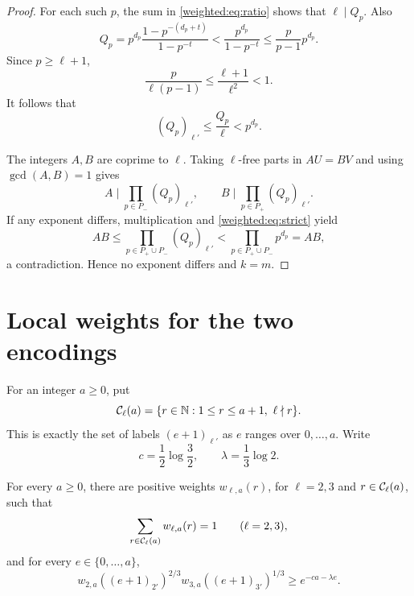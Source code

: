 \begin{proof}
For each such $p$, the sum in \eqref{weighted:eq:ratio} shows that $\ell\mid Q_p$. Also
\[
Q_p=p^{d_p}\frac{1-p^{-(d_p+t)}}{1-p^{-t}}
<\frac{p^{d_p}}{1-p^{-t}}
\le\frac p{p-1}p^{d_p}.
\]
Since $p\ge\ell+1$,
\[
\frac{p}{\ell(p-1)}\le\frac{\ell+1}{\ell^2}<1.
\]
It follows that
\begin{equation}\label{weighted:eq:strict}
(Q_p)_{\ell'}\le\frac{Q_p}{\ell}<p^{d_p}.
\end{equation}

The integers $A,B$ are coprime to $\ell$. Taking $\ell$-free parts in $AU=BV$ and using $\gcd(A,B)=1$ gives
\[
A\mid\prod_{p\in P_-}(Q_p)_{\ell'},\qquad
B\mid\prod_{p\in P_+}(Q_p)_{\ell'}.
\]
If any exponent differs, multiplication and \eqref{weighted:eq:strict} yield
\[
AB\le\prod_{p\in P_+\cup P_-}(Q_p)_{\ell'}
<\prod_{p\in P_+\cup P_-}p^{d_p}=AB,
\]
a contradiction. Hence no exponent differs and $k=m$.
\end{proof}


\section{Local weights for the two encodings}
For an integer $a\ge0$, put
\[
\CC_\ell(a)=\{r\in\NN:1\le r\le a+1,\ \ell\nmid r\}.
\]
This is exactly the set of labels $(e+1)_{\ell'}$ as $e$ ranges over $0,\ldots,a$. Write
\[
c=\frac12\log\frac32,\qquad \lambda=\frac13\log2.
\]

\begin{lemma}\label{weighted:lem:weights}
For every $a\ge0$, there are positive weights $w_{\ell,a}(r)$, for $\ell=2,3$ and $r\in\mathcal C_\ell(a)$, such that
\begin{equation}\label{weighted:eq:normalized}
\sum_{r\in\mathcal C_\ell(a)}w_{\ell,a}(r)=1\qquad(\ell=2,3),
\end{equation}
and for every $e\in\{0,\ldots,a\}$,
\begin{equation}\label{weighted:eq:local}
\boxed{w_{2,a}((e+1)_{2'})^{2/3}
       w_{3,a}((e+1)_{3'})^{1/3}
       \ge e^{-ca-\lambda e}.}
\end{equation}
\end{lemma}

